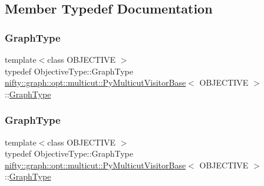 \subsection{Member Typedef Documentation}
\mbox{\label{classnifty_1_1graph_1_1opt_1_1multicut_1_1PyMulticutVisitorBase_ada1318d86f01ad85d8f61c410b4bdd57}} 
\subsubsection{\texorpdfstring{Graph\+Type}{GraphType}\hspace{0.1cm}{\footnotesize\ttfamily [1/2]}}
{\footnotesize\ttfamily template$<$class O\+B\+J\+E\+C\+T\+I\+VE $>$ \\
typedef Objective\+Type\+::\+Graph\+Type \hyperlink{classnifty_1_1graph_1_1opt_1_1multicut_1_1PyMulticutVisitorBase}{nifty\+::graph\+::opt\+::multicut\+::\+Py\+Multicut\+Visitor\+Base}$<$ O\+B\+J\+E\+C\+T\+I\+VE $>$\+::\hyperlink{classnifty_1_1graph_1_1opt_1_1multicut_1_1PyMulticutVisitorBase_ada1318d86f01ad85d8f61c410b4bdd57}{Graph\+Type}}

\mbox{\label{classnifty_1_1graph_1_1opt_1_1multicut_1_1PyMulticutVisitorBase_ada1318d86f01ad85d8f61c410b4bdd57}} 
\subsubsection{\texorpdfstring{Graph\+Type}{GraphType}\hspace{0.1cm}{\footnotesize\ttfamily [2/2]}}
{\footnotesize\ttfamily template$<$class O\+B\+J\+E\+C\+T\+I\+VE $>$ \\
typedef Objective\+Type\+::\+Graph\+Type \hyperlink{classnifty_1_1graph_1_1opt_1_1multicut_1_1PyMulticutVisitorBase}{nifty\+::graph\+::opt\+::multicut\+::\+Py\+Multicut\+Visitor\+Base}$<$ O\+B\+J\+E\+C\+T\+I\+VE $>$\+::\hyperlink{classnifty_1_1graph_1_1opt_1_1multicut_1_1PyMulticutVisitorBase_ada1318d86f01ad85d8f61c410b4bdd57}{Graph\+Type}}

